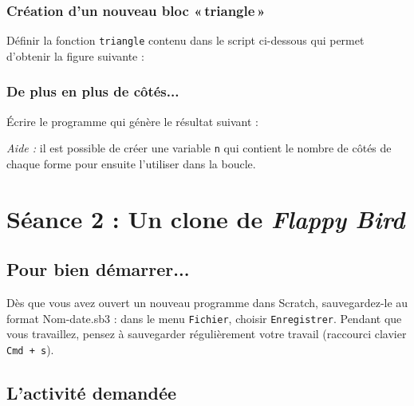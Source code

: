 \subsubsection{Création d'un nouveau bloc «\,triangle\,»}

Définir la fonction \texttt{triangle} contenu dans le script ci-dessous qui permet d'obtenir la figure suivante :


\subsubsection{De plus en plus de côtés...}

Écrire le programme qui génère le résultat suivant :


\emph{Aide :} il est possible de créer une variable \texttt{n} qui contient le nombre de côtés de chaque forme pour ensuite l'utiliser dans la boucle.


\newpage 

%
%
%
%




\section{Séance 2 : Un clone de \emph{Flappy Bird}}\label{ficheScratch4e2}

\subsection{Pour bien démarrer...}

Dès que vous avez ouvert un nouveau programme dans Scratch, sauvegardez-le au format Nom-date.sb3 : dans le menu \texttt{Fichier}, choisir \texttt{Enregistrer}. Pendant que vous travaillez, pensez à sauvegarder régulièrement votre travail (raccourci clavier \texttt{Cmd + s}).   


\subsection{L'activité demandée}

\vspace{10pt}

